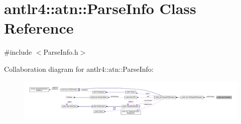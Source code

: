 \hypertarget{classantlr4_1_1atn_1_1ParseInfo}{}\section{antlr4\+:\+:atn\+:\+:Parse\+Info Class Reference}
\label{classantlr4_1_1atn_1_1ParseInfo}


{\ttfamily \#include $<$Parse\+Info.\+h$>$}



Collaboration diagram for antlr4\+:\+:atn\+:\+:Parse\+Info\+:
\nopagebreak
\begin{figure}[H]
\begin{center}
\leavevmode
\includegraphics[width=350pt]{classantlr4_1_1atn_1_1ParseInfo__coll__graph}
\end{center}
\end{figure}
